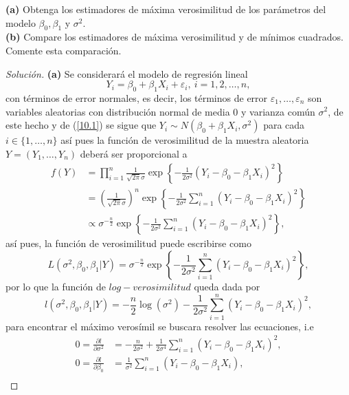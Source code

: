 \documentclass[10.5pt,notitlepage]{article}
\newenvironment{solucion}
  {\begin{proof}[Solución]}
  {\end{proof}}
\newcommand{\ee}{\varepsilon}
\newcommand{\kis}[1]{\left\{ #1 \right\}}
\newcommand{\pare}[1]{\left( #1 \right)}
\begin{document}
\noindent \textbf{(a)} Obtenga los estimadores de máxima verosimilitud de los parámetros del modelo \(\beta_0, \beta_1\) y \(\sigma^2\).\\ 

\noindent \textbf{(b)} Compare los estimadores de máxima verosimilitud y de mínimos cuadrados. Comente esta comparación. 
\begin{solucion}
\noindent \textbf{(a)} Se considerará el modelo de regresión lineal 
\begin{equation}\label{10.1}
  Y_i = \beta_0 + \beta_1 X_i + \ee_i,\ i =1,2,\hdots,n,     
\end{equation}
con términos de error normales, es decir, los términos de error \(\ee_1, \hdots, \ee_n\) son variables aleatorias con distribución normal de media \(0\) y varianza común \(\sigma^2\), de este hecho y de (\ref{10.1}) se sigue que \(Y_i \sim N(\beta_0 + \beta_1 X_i, \sigma^2)\) para cada \(i \in \{1, \hdots, n\}\) así pues la función de verosimilitud de la muestra aleatoria \(Y=(Y_1, \hdots, Y_n)\) deberá ser proporcional a 
\begin{align}\label{10.1}
    f(Y) &= \prod_{i=1}^{n}\frac{1}{\sqrt{2\pi} \sigma}\exp\kis{- \frac{1}{2\sigma^2}(Y_i - \beta_0 - \beta_1 X_i)^2}\nonumber\\ 
         &= \pare{\frac{1}{\sqrt{2\pi}\sigma}}^{n}\exp\kis{- \frac{1}{2\sigma^2}\sum_{i=1}^{n}(Y_i - \beta_0 - \beta_1 X_i)^2}\nonumber\\ 
         &\propto \sigma^{-\frac{n}{2}}\exp\kis{- \frac{1}{2\sigma^2}\sum_{i=1}^{n}(Y_i - \beta_0 - \beta_1 X_i)^2},
\end{align}
así pues, la función de verosimilitud puede escribirse como 
\[
L(\sigma^2, \beta_0, \beta_1|Y) = \sigma^{-\frac{n}{2}}\exp\kis{- \frac{1}{2\sigma^2}\sum_{i=1}^{n}(Y_i - \beta_0 - \beta_1 X_i)^2},
\]
por lo que la función de \(log-verosimilitud\) queda dada por 
\begin{equation}\label{10.2}
   l(\sigma^2, \beta_0, \beta_1|Y) = - \frac{n}{2}\log(\sigma^2)- \frac{1}{2\sigma^2}\sum_{i=1}^{n}(Y_i - \beta_0 - \beta_1 X_i)^2, 
\end{equation}
para encontrar el máximo verosímil se buscara resolver las ecuaciones, i.e
\begin{align}
    0=\frac{\partial l}{\partial \sigma^2} &= -\frac{n}{2\sigma^2} + \frac{1}{2\sigma^4}\sum_{i=1}^{n}(Y_i - \beta_0 - \beta_1 X_i)^2,\label{10.3}\\ 
    0=\frac{\partial l}{\partial \beta_0} &=\frac{1}{\sigma^2}\sum_{i=1}^{n}(Y_i - \beta_0 - \beta_1 X_i),\label{10.4}\\ 

\end{align}
\end{solucion}
\end{document}
